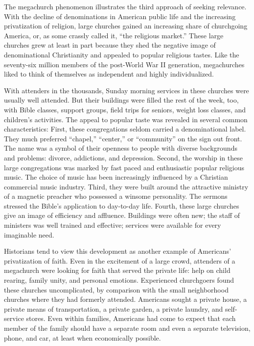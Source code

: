 The megachurch phenomenon illustrates the third approach of seeking relevance. With the decline of
denominations in American public life and the increasing privatization of religion, large churches
gained an increasing share of churchgoing America, or, as some crassly called it, “the religious
market.” These large churches grew at least in part because they shed the negative image of
denominational Christianity and appealed to popular religious tastes. Like the seventy-six million
members of the post-World War II generation, megachurches liked to think of themselves as
independent and highly individualized.

With attenders in the thousands, Sunday morning services in these churches were usually well
attended. But their buildings were filled the rest of the week, too, with Bible classes, support
groups, field trips for seniors, weight loss classes, and children’s activities. The appeal to
popular taste was revealed in several common characteristics: First, these congregations seldom
carried a denominational label. They much preferred “chapel,” “center,” or “community” on the sign
out front. The name was a symbol of their openness to people with diverse backgrounds and problems:
divorce, addictions, and depression. Second, the worship in these large congregations was marked by
fast paced and enthusiastic popular religious music. The choice of music has been increasingly
influenced by a Christian commercial music industry. Third, they were built around the attractive
ministry of a magnetic preacher who possessed a winsome personality. The sermons stressed the
Bible’s application to day-to-day life. Fourth, these large churches give an image of efficiency and
affluence. Buildings were often new; the staff of ministers was well trained and effective; services
were available for every imaginable need.

Historians tend to view this development as another example of Americans’ privatization of faith.
Even in the excitement of a large crowd, attenders of a megachurch were looking for faith that
served the private life: help on child rearing, family unity, and personal emotions. Experienced
churchgoers found these churches uncomplicated, by comparison with the small neighborhood churches
where they had formerly attended. Americans sought a private house, a private means of
transportation, a private garden, a private laundry, and self-service stores. Even within families,
Americans had come to expect that each member of the family should have a separate room and even a
separate television, phone, and car, at least when economically possible.

